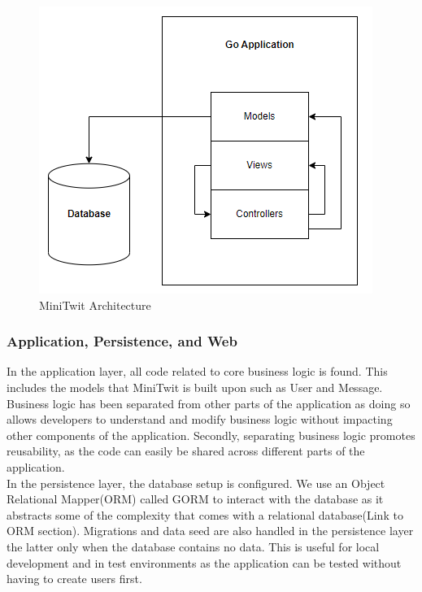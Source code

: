 \begin{figure}[H]
    \centering
    \captionsetup{justification=centering,margin=1cm}
    \includegraphics[width=0.8\linewidth]{./images/system_architecture.png}
    \caption{MiniTwit Architecture}
    \label{fig:minitwit}
\end{figure}



\subsubsection{Application, Persistence, and Web}
In the application layer, all code related to core business logic is found. This includes the models that MiniTwit is built upon such as User and Message. 
Business logic has been separated from other parts of the application as doing so allows developers to understand and 
modify business logic without impacting other components of the application. Secondly, separating business logic promotes reusability, 
as the code can easily be shared across different parts of the application.     \\

In the persistence layer, the database setup is configured. We use an Object Relational Mapper(ORM) called GORM to interact 
with the database as it abstracts some of the complexity that comes with a relational database(Link to ORM section). 
Migrations and data seed are also handled in the persistence layer the latter only when the database contains no data. 
This is useful for local development and in test environments as the application can be tested without having to create users first. \\

